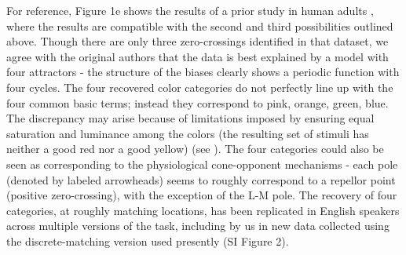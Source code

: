 \documentclass[9pt,biorxiv,lineno,onehalfspacing]{lapreprint}
\begin{document}
\begin{refsection}
For reference, Figure 1e shows the results of a prior study in human adults \citep{bae_why_2015}, where the results are compatible with the second and third possibilities outlined above.
Though there are only three zero-crossings identified in that dataset, we agree with the original authors that the data is best explained by a model with four attractors - the structure of the biases clearly shows a periodic function with four cycles.
The four recovered color categories do not perfectly line up with the four common basic terms; instead they correspond to pink, orange, green, blue.
The discrepancy may arise because of limitations imposed by ensuring equal saturation and luminance among the colors (the resulting set of stimuli has neither a good red nor a good yellow) (see \citep{bae_why_2015}). 
The four categories could also be seen as corresponding to the physiological cone-opponent mechanisms - each pole (denoted by labeled arrowheads) seems to roughly correspond to a repellor point (positive zero-crossing), with the exception of the L-M pole.
The recovery of four categories, at roughly matching locations, has been replicated in English speakers \citep{panichello_error-correcting_2019} across multiple versions of the task, including by us in new data collected using the discrete-matching version used presently (SI Figure 2). 


\end{refsection}
\end{document}

